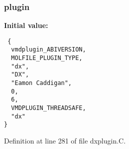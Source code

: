 \subsubsection{ plugin\hspace{0.3cm}{\tt  [static]}}\label{dxplugin_8C_a1}


{\bf Initial value:}

\footnotesize\begin{verbatim} {
  vmdplugin_ABIVERSION,   
  MOLFILE_PLUGIN_TYPE,    
  "dx",                   
  "DX",                   
  "Eamon Caddigan",       
  0,                      
  6,                      
  VMDPLUGIN_THREADSAFE,   
  "dx"                    
}\end{verbatim}\normalsize 


Definition at line 281 of file dxplugin.C.